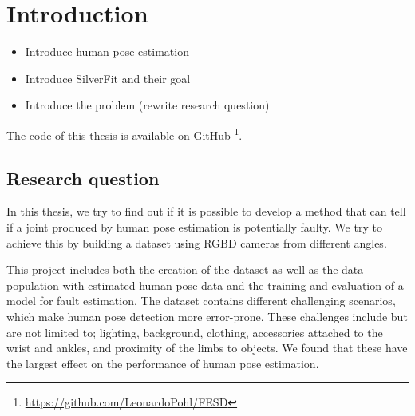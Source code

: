 \chapter{Introduction}
\setcounter{page}{1}
\begin{itemize}
  \item Introduce human pose estimation
  \item Introduce SilverFit and their goal
  \item Introduce the problem (rewrite research question)
\end{itemize}

The code of this thesis is available on GitHub \footnote{\url{https://github.com/LeonardoPohl/FESD}}.

\section{Research question}

In this thesis, we try to find out if it is possible to develop a method that can tell if a joint produced by human pose estimation is potentially faulty. We try to achieve this by building a dataset using RGBD cameras from different angles.

This project includes both the creation of the dataset as well as the data population with estimated human pose data and the training and evaluation of a model for fault estimation. The dataset contains different challenging scenarios, which make human pose detection more error-prone. These challenges include but are not limited to; lighting, background, clothing, accessories attached to the wrist and ankles, and proximity of the limbs to objects. We found that these have the largest effect on the performance of human pose estimation. 
